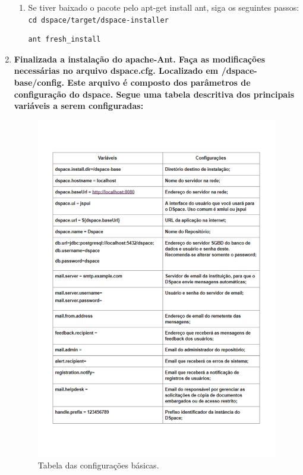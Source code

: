 \documentclass[12pt,hidelinks]{article}
\begin{document}
\begin{enumerate}
\begin{enumerate}
            \item Se tiver baixado o pacote pelo apt-get install ant, siga os seguintes passos:\\
            
            \texttt{cd dspace/target/dspace-installer}\\
            
            \begin{verbatim}
ant fresh_install
            \end{verbatim}

            \end{enumerate}
            
        \item \textbf{Finalizada a instalação do apache-Ant. Faça as modificações necessárias no arquivo dspace.cfg. Localizado em /dspace-base/config. Este arquivo é composto dos parâmetros de configuração do dspace. Segue uma tabela descritiva dos principais variáveis a serem configuradas:}
            
        \begin{figure}[!ph]
            \centering
            \includegraphics[scale=0.7]{figura/variaveis.pdf}
            \caption{Tabela das configurações básicas.}
        \label{Rotulo}
        \end{figure}
        

\end{enumerate}
\end{document}
